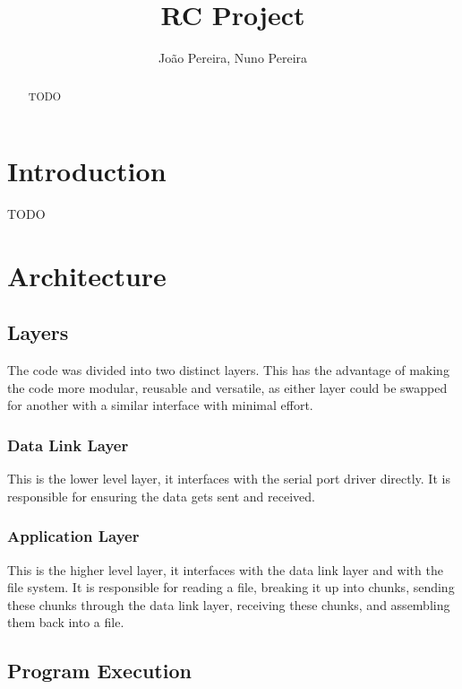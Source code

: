 \documentclass[11pt,a4paper]{article}
\title{RC Project}
\author{João Pereira, Nuno Pereira}
\begin{document}
    
\maketitle

\begin{abstract}
    TODO
\end{abstract}




\section{Introduction}

TODO

\section{Architecture}

\subsection{Layers}

The code was divided into two distinct layers. This has the advantage of making the code more modular, reusable and versatile, as either layer could be swapped for another with a similar interface with minimal effort.

\subsubsection{Data Link Layer}

This is the lower level layer, it interfaces with the serial port driver directly. It is responsible for ensuring the data gets sent and received.

\subsubsection{Application Layer}

This is the higher level layer, it interfaces with the data link layer and with the file system. It is responsible for reading a file, breaking it up into chunks, sending these chunks through the data link layer, receiving these chunks, and assembling them back into a file.

\subsection{Program Execution}
\end{document}
